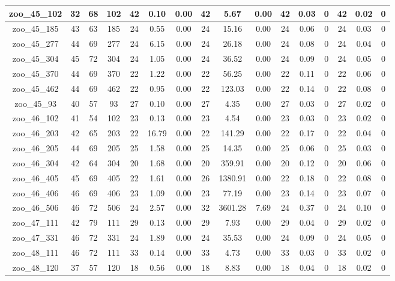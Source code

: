 \begin{landscape}
\begin{longtable}{|c|c|c|c|c|c|c|c|c|c|c|c|c|c|c|c|}
zoo\_45\_102 & 32 & 68 & 102 & 42 & 0.10 & 0.00 & 42 & 5.67 & 0.00 & 42 & 0.03 & 0 & 42 & 0.02 & 0 \\ \hline 
zoo\_45\_185 & 43 & 63 & 185 & 24 & 0.55 & 0.00 & 24 & 15.16 & 0.00 & 24 & 0.06 & 0 & 24 & 0.03 & 0 \\ \hline 
zoo\_45\_277 & 44 & 69 & 277 & 24 & 6.15 & 0.00 & 24 & 26.18 & 0.00 & 24 & 0.08 & 0 & 24 & 0.04 & 0 \\ \hline 
zoo\_45\_304 & 45 & 72 & 304 & 24 & 1.05 & 0.00 & 24 & 36.52 & 0.00 & 24 & 0.09 & 0 & 24 & 0.05 & 0 \\ \hline 
zoo\_45\_370 & 44 & 69 & 370 & 22 & 1.22 & 0.00 & 22 & 56.25 & 0.00 & 22 & 0.11 & 0 & 22 & 0.06 & 0 \\ \hline 
zoo\_45\_462 & 44 & 69 & 462 & 22 & 0.95 & 0.00 & 22 & 123.03 & 0.00 & 22 & 0.14 & 0 & 22 & 0.08 & 0 \\ \hline 
zoo\_45\_93 & 40 & 57 & 93 & 27 & 0.10 & 0.00 & 27 & 4.35 & 0.00 & 27 & 0.03 & 0 & 27 & 0.02 & 0 \\ \hline 
zoo\_46\_102 & 41 & 54 & 102 & 23 & 0.13 & 0.00 & 23 & 4.54 & 0.00 & 23 & 0.03 & 0 & 23 & 0.02 & 0 \\ \hline 
zoo\_46\_203 & 42 & 65 & 203 & 22 & 16.79 & 0.00 & 22 & 141.29 & 0.00 & 22 & 0.17 & 0 & 22 & 0.04 & 0 \\ \hline 
zoo\_46\_205 & 44 & 69 & 205 & 25 & 1.58 & 0.00 & 25 & 14.35 & 0.00 & 25 & 0.06 & 0 & 25 & 0.03 & 0 \\ \hline 
zoo\_46\_304 & 42 & 64 & 304 & 20 & 1.68 & 0.00 & 20 & 359.91 & 0.00 & 20 & 0.12 & 0 & 20 & 0.06 & 0 \\ \hline 
zoo\_46\_405 & 45 & 69 & 405 & 22 & 1.61 & 0.00 & 26 & 1380.91 & 0.00 & 22 & 0.18 & 0 & 22 & 0.08 & 0 \\ \hline 
zoo\_46\_406 & 46 & 69 & 406 & 23 & 1.09 & 0.00 & 23 & 77.19 & 0.00 & 23 & 0.14 & 0 & 23 & 0.07 & 0 \\ \hline 
zoo\_46\_506 & 46 & 72 & 506 & 24 & 2.57 & 0.00 & 32 & 3601.28 & 7.69 & 24 & 0.37 & 0 & 24 & 0.10 & 0 \\ \hline 
zoo\_47\_111 & 42 & 79 & 111 & 29 & 0.13 & 0.00 & 29 & 7.93 & 0.00 & 29 & 0.04 & 0 & 29 & 0.02 & 0 \\ \hline 
zoo\_47\_331 & 46 & 72 & 331 & 24 & 1.89 & 0.00 & 24 & 35.53 & 0.00 & 24 & 0.09 & 0 & 24 & 0.05 & 0 \\ \hline 
zoo\_48\_111 & 46 & 72 & 111 & 33 & 0.14 & 0.00 & 33 & 4.73 & 0.00 & 33 & 0.03 & 0 & 33 & 0.02 & 0 \\ \hline 
zoo\_48\_120 & 37 & 57 & 120 & 18 & 0.56 & 0.00 & 18 & 8.83 & 0.00 & 18 & 0.04 & 0 & 18 & 0.02 & 0 \\ \hline 

\end{longtable}
\end{landscape}
